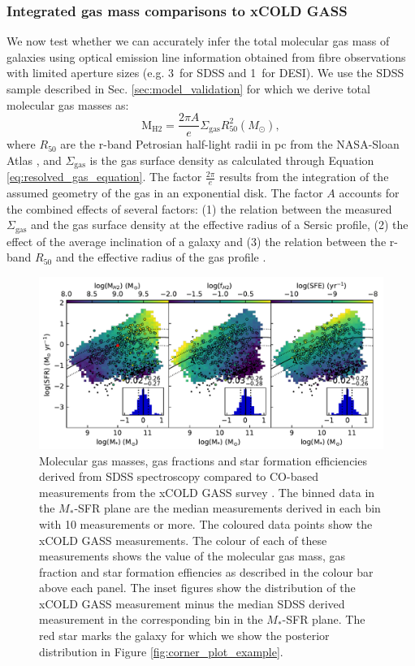\documentclass[fleqn,usenatbib]{mnras}
\begin{document}
\subsubsection{Integrated gas mass comparisons to xCOLD GASS}
\label{sec:comparison_xcoldgass}
We now test whether we can accurately infer the total molecular gas mass of galaxies using optical emission line information obtained from fibre observations with limited aperture sizes (e.g. 3\arcsec\ for SDSS and 1\arcsec\ for DESI). We use the SDSS sample described in Sec. \ref{sec:model_validation} for which we derive total molecular gas masses as:
\begin{equation}
    \label{eq:gas_surface_density_to_mass}
    \textrm{M}_{\textrm{H2}} = \frac{2\pi A}{e} \Sigma_{\textrm{gas}} R_{50}^{2} (M_{\odot}), 
\end{equation}
where $R_{50}$ are the r-band Petrosian half-light radii in pc from the NASA-Sloan Atlas \citep{blanton2011}, and $\Sigma_{\textrm{gas}}$ is the gas surface density as calculated through Equation \ref{eq:resolved_gas_equation}. The factor $\frac{2\pi}{e}$ results from the integration of the assumed geometry of the gas in an exponential disk. The factor $A$ accounts for the combined effects of several factors: (1) the relation between the measured $\Sigma_{\textrm{gas}}$ and the gas surface density at the effective radius of a Sersic profile, (2) the effect of the average inclination of a galaxy and (3) the relation between the r-band $R_{50}$ and the effective radius of the gas profile \citep{casasola2017}. 

\begin{figure}
    \centering
    \includegraphics[width=\textwidth]{figures/fig10.pdf}
    \caption{Molecular gas masses, gas fractions and star formation efficiencies derived from SDSS spectroscopy compared to CO-based measurements from the xCOLD GASS survey \citep{saintonge2017}. The binned data in the $M_{*}$-SFR plane are the median measurements derived in each bin with 10 measurements or more. The coloured data points show the xCOLD GASS measurements. The colour of each of these measurements shows the value of the molecular gas mass, gas fraction and star formation effiencies as described in the colour bar above each panel. The inset figures show the distribution of the xCOLD GASS measurement minus the median SDSS derived measurement in the corresponding bin in the $M_{*}$-SFR plane. The red star marks the galaxy for which we show the posterior distribution in Figure \ref{fig:corner_plot_example}.}
    \label{fig:MH2_FH2_SFE_comparison_xCOLDGASS}
\end{figure}
\end{document}
